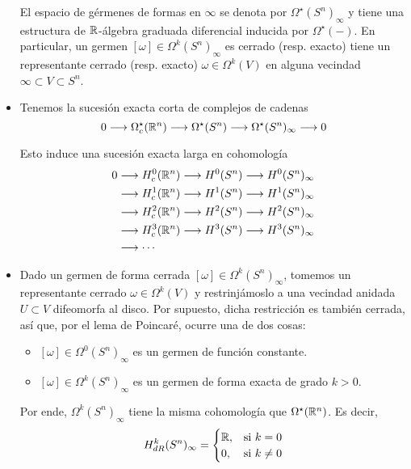 \begin{solution}
\begin{itemize}
    El espacio de gérmenes de formas en $\infty$ se denota por $\Omega^\star(S^n)_\infty$ y tiene una estructura de $\mathbb R$-álgebra graduada diferencial inducida por $\Omega^\star(-)$. En particular, un germen $[\omega] \in \Omega^k(S^n)_\infty$ es cerrado (resp. exacto) tiene un representante cerrado (resp. exacto) $\omega \in \Omega^k(V)$ en alguna vecindad $\infty \subset V \subset S^n$.
    
    \item Tenemos la sucesión exacta corta de complejos de cadenas
    $$
    0
        \longrightarrow \Omega_c^\star(\mathbb R^n)
        \longrightarrow \Omega^\star(S^n)
        \longrightarrow \Omega^\star(S^n)_\infty
        \longrightarrow 0
    $$
    
    Esto induce una sucesión exacta larga en cohomología
    \begin{align*}
    0 & \longrightarrow H_c^0(\mathbb R^n) \longrightarrow H^0(S^n) \longrightarrow H^0(S^n)_\infty \\
      & \longrightarrow H_c^1(\mathbb R^n) \longrightarrow H^1(S^n) \longrightarrow H^1(S^n)_\infty \\
      & \longrightarrow H_c^2(\mathbb R^n) \longrightarrow H^2(S^n) \longrightarrow H^2(S^n)_\infty \\
      & \longrightarrow H_c^3(\mathbb R^n) \longrightarrow H^3(S^n) \longrightarrow H^3(S^n)_\infty \\
      & \longrightarrow \cdots
    \end{align*}
    
    \item Dado un germen de forma cerrada $[\omega] \in \Omega^k(S^n)_\infty$, tomemos un representante cerrado $\omega \in \Omega^k(V)$ y restrinjámoslo a una vecindad anidada $U \subset V$ difeomorfa al disco. Por supuesto, dicha restricción es también cerrada, así que, por el lema de Poincaré, ocurre una de dos cosas:
    \begin{itemize}
        \item $[\omega] \in \Omega^0(S^n)_\infty$ es un germen de función constante.
        \item $[\omega] \in \Omega^k(S^n)_\infty$ es un germen de forma exacta de grado $k > 0$.
    \end{itemize}
    
    Por ende, $\Omega^k(S^n)_\infty$ tiene la misma cohomología que $\Omega^\star(\mathbb R^n)$. Es decir,
    $$
    H_{dR}^k(S^n)_\infty =
        \begin{cases}
            \mathbb R, & \text{si } k = 0 \\
            0, & \text{si } k \ne 0
        \end{cases}
    $$
    

\end{itemize}
\end{solution}
